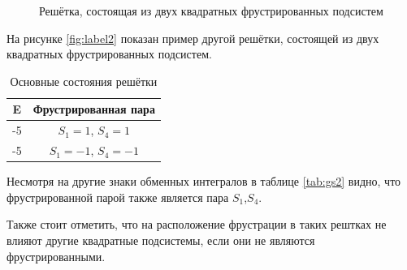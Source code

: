 \documentclass[utf8, babel, sor, jor, amsmath,amssymb, reprint]{elsarticle} %
\begin{document}
\begin{figure}[h]
	\centering
	\caption{Решётка, состоящая из двух квадратных фрустрированных подсистем}
	\label{fig:label2}
\end{figure}

На рисунке \eqref{fig:label2} показан пример другой решётки, состоящей из двух квадратных фрустрированных подсистем.

\begin{table}[h]
	\centering
	\begin{tabular}{|c|c|}
		\hline
		E   &   Фрустрированная пара \\
		\hline
		-5   &  $S_1=1$, $S_4=1$ \\
		\hline
		-5   &   $S_1=-1$, $S_4=-1$ \\
		\hline
	\end{tabular}
	\caption{Основные состояния решётки}
	\label{tab:gs2}
\end{table}

Несмотря на другие знаки обменных интегралов в таблице \eqref{tab:gs2} видно, что фрустрированной парой также является пара $S_1$,$S_4$.

Также стоит отметить, что на расположение фрустрации в таких рештках не влияют другие квадратные подсистемы, если они не являются фрустрированными.
\end{document}
